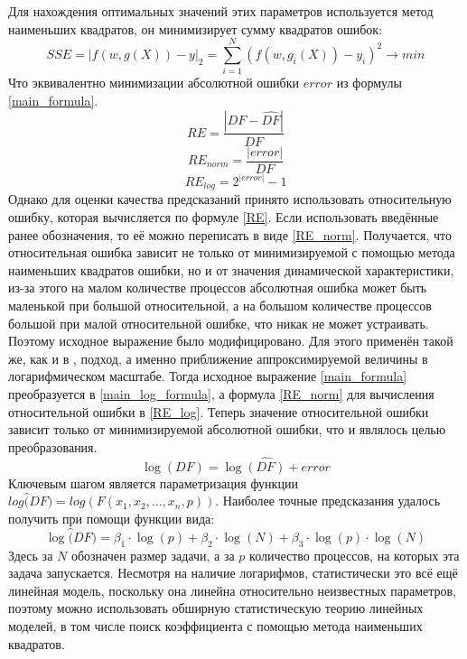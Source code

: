 		Для нахождения оптимальных значений этих параметров используется метод наименьших квадратов, он минимизирует сумму квадратов ошибок:
		\[
		SSE = |f(w, g(X)) - y|_2 = \sum_{i = 1}^{N}{(f(w, g_i(X)) - y_i)^2 \rightarrow min}
		\]
		Что эквивалентно минимизации абсолютной ошибки \(error\) из формулы \eqref{main_formula}.
		\begin{equation}
			\label{RE} 
			RE = \frac{|DF - \hat{DF}|}{DF}
		\end{equation}
		\begin{equation}
			\label{RE_norm}
			RE_{norm} = \frac{|error|}{DF}
		\end{equation}
		\begin{equation}
			\label{RE_log}
			RE_{log}= 2^{|error|} - 1
		\end{equation}
		Однако для оценки качества предсказаний принято использовать относительную ошибку, которая вычисляется по формуле \eqref{RE}. Если использовать введённые ранее обозначения, то её можно переписать в виде \eqref{RE_norm}. Получается, что относительная ошибка зависит не только от минимизируемой с помощью метода наименьших квадратов ошибки, но и от значения динамической характеристики, из-за этого на малом количестве процессов абсолютная ошибка может быть маленькой при большой относительной, а на большом количестве процессов большой при малой относительной ошибке, что никак не может устраивать. Поэтому исходное выражение было модифицировано. Для этого применён такой же, как и в \cite{log_main}, подход, а именно приближение аппроксимируемой величины в логарифмическом масштабе. Тогда исходное выражение \eqref{main_formula} преобразуется в \eqref{main_log_formula}, а формула \eqref{RE_norm} для вычисления относительной ошибки в \eqref{RE_log}. Теперь значение относительной ошибки зависит только от минимизируемой абсолютной ошибки, что и являлось целью преобразования.
		\begin{equation}\label{main_log_formula}
		\log{(DF)} = \log{\hat{(DF)}} + error
		\end{equation}
		Ключевым шагом является параметризация функции \(log{\hat(DF)} = log(F(x_1, x_2, \ldots, x_n, p))\). Наиболее точные предсказания удалось получить при помощи функции вида:
		\begin{equation}
		\log{\hat(DF)} = \beta_{1} \cdot \log{(p)} + \beta_{2} \cdot \log{(N)} + \beta_{3} \cdot \log{(p)} \cdot \log{(N)}
		\end{equation}
		Здесь за \(N\) обозначен размер задачи, а за \(p\) количество процессов, на которых эта задача запускается. Несмотря на наличие логарифмов, статистически это всё ещё линейная модель, поскольку она линейна относительно неизвестных параметров, поэтому можно использовать обширную статистическую теорию линейных моделей, в том числе поиск коэффициента с помощью метода наименьших квадратов.

